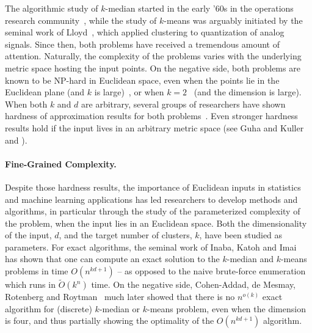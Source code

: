 \documentclass[11pt]{article}
\renewcommand{\tilde}{\widetilde}
\begin{document}
The algorithmic study of $k$-median started in the early '60s in the operations research community~\cite{kuehn1963heuristic,stollsteimer1961effect,hakimi1965optimum}, while the study of $k$-means was arguably
 initiated by the seminal work of Lloyd~\cite{lloyd1982least}, which applied clustering to quantization of analog signals. 
Since then, both problems have received a tremendous amount of attention.
Naturally, the complexity of the problems varies
with the underlying metric space hosting the input points. 
On the negative side, both problems are
known to be NP-hard in Euclidean space, even when the points lie in the Euclidean plane (and $k$ is large)~\cite{megiddo1984complexity, MahajanNV12}, or when $k=2$~\cite{dasgupta2009random,AKP24} (and the dimension is large).
When both $k$ and $d$ are arbitrary, 
several groups of researchers have shown hardness
of approximation results for both problems~\cite{AwasthiCKS15,LeeSW17,Cohen-AddadS19,Cohen-AddadSL22}. 
Even stronger hardness
results hold if the input lives in an arbitrary metric space (see Guha and Kuller~\cite{GuK99} and \cite{Cohen-AddadSL21}).

 


\paragraph*{Fine-Grained Complexity.}
Despite those hardness results, the importance of Euclidean inputs in statistics and
machine learning applications 
has led researchers to develop methods and algorithms, in particular through the study of the parameterized complexity of the problem, when the input lies in an Euclidean space. 
Both the dimensionality of the input, $d$, and the target number of clusters, $k$, have been studied as parameters. 
For exact algorithms, the seminal work of Inaba, Katoh and Imai~\cite{InabaKI94} has shown that one can compute an exact solution to the $k$-median and $k$-means problems in time $O(n^{kd+1})$ -- as opposed to the  naive brute-force enumeration which runs in $\tilde{O}(k^n)$ time.
On the negative side, Cohen-Addad, de Mesmay, Rotenberg and Roytman~\cite{CohenaddadSODA18} much later showed that there is no $n^{o(k)}$ exact algorithm for (discrete) $k$-median or $k$-means problem, even when
the dimension is four, and thus partially showing the optimality of the $O(n^{kd + 1})$ algorithm.
\end{document}
